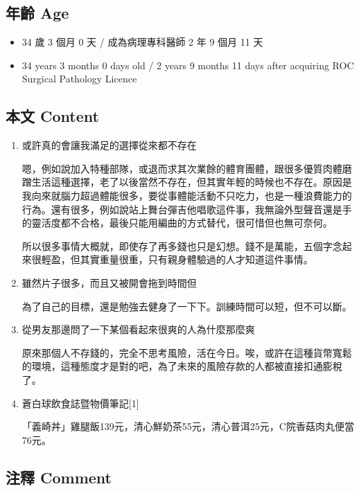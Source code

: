 \documentclass[
]{article}
\providecommand{\tightlist}{%
  \setlength{\itemsep}{0pt}\setlength{\parskip}{0pt}}
\begin{document}
\hypertarget{ux5e74ux9f61-age-20}{%
\subsection{年齡 Age}\label{ux5e74ux9f61-age-20}}

\begin{itemize}
\tightlist
\item
  34 歲 3 個月 0 天 / 成為病理專科醫師 2 年 9 個月 11 天
\item
  34 years 3 months 0 days old / 2 years 9 months 11 days after
  acquiring ROC Surgical Pathology Licence
\end{itemize}

\hypertarget{ux672cux6587-content-20}{%
\subsection{本文 Content}\label{ux672cux6587-content-20}}

\begin{enumerate}
\def\labelenumi{\arabic{enumi}.}
\item
  或許真的會讓我滿足的選擇從來都不存在

  嗯，例如說加入特種部隊，或退而求其次業餘的體育團體，跟很多優質肉體磨蹭生活這種選擇，老了以後當然不存在，但其實年輕的時候也不存在。原因是我向來就腦力超過體能很多，要從事體能活動不只吃力，也是一種浪費能力的行為。還有很多，例如說站上舞台彈吉他唱歌這件事，我無論外型聲音還是手的靈活度都不合格，最後只能用編曲的方式替代，很可惜但也無可奈何。

  所以很多事情大概就，即使存了再多錢也只是幻想。錢不是萬能，五個字念起來很輕盈，但其實重量很重，只有親身體驗過的人才知道這件事情。
\item
  雖然片子很多，而且又被開會拖到時間但

  為了自己的目標，還是勉強去健身了一下下。訓練時間可以短，但不可以斷。
\item
  從男友那邊問了一下某個看起來很爽的人為什麼那麼爽

  原來那個人不存錢的，完全不思考風險，活在今日。唉，或許在這種貨幣寬鬆的環境，這種態度才是對的吧，為了未來的風險存款的人都被直接扣通膨稅了。
\item
  蒼白球飲食誌暨物價筆記{[}1{]}

  「義崎丼」雞腿飯139元，清心鮮奶茶55元，清心普洱25元，C院香菇肉丸便當76元。
\end{enumerate}

\hypertarget{ux6ce8ux91cb-comment-20}{%
\subsection{注釋 Comment}\label{ux6ce8ux91cb-comment-20}}
\end{document}
